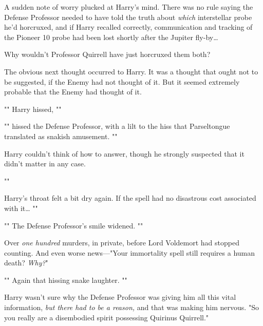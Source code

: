 A sudden note of worry plucked at Harry's mind. There was no rule saying the
Defense Professor needed to have told the truth about \emph{which} interstellar
probe he'd horcruxed, and if Harry recalled correctly, communication and
tracking of the Pioneer 10 probe had been lost shortly after the Jupiter
fly-by{\ldots}

Why wouldn't Professor Quirrell have just horcruxed them both?

The obvious next thought occurred to Harry. It was a thought that ought not to
be suggested, if the Enemy had not thought of it. But it seemed extremely
probable that the Enemy had thought of it.

"" Harry hissed, ""

"" hissed the Defense Professor, with a lilt to the hiss
that Parseltongue translated as snakish amusement. ""

Harry couldn't think of how to answer, though he strongly suspected that it
didn't matter in any case.

""

Harry's throat felt a bit dry again. If the spell had no disastrous cost
associated with it{\ldots} ""

""
The Defense Professor's smile widened. ""

Over \emph{one hundred} murders, in private, before Lord Voldemort had stopped
counting. And even worse news---"Your immortality spell still requires a human
death? \emph{Why?}"

"" Again that hissing snake laughter.
""

Harry wasn't sure why the Defense Professor was giving him all this vital
information, \emph{but there had to be a reason,} and that was making him
nervous. "So you really are a disembodied spirit possessing Quirinus Quirrell."

